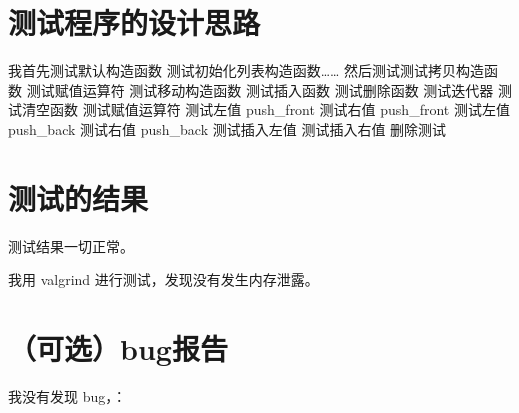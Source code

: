﻿\documentclass[UTF8]{ctexart}
\begin{document}
\pagestyle{fancy}
\fancyhead{}

\section{测试程序的设计思路}

我首先测试默认构造函数
测试初始化列表构造函数……
然后测试测试拷贝构造函数
测试赋值运算符
测试移动构造函数
测试插入函数
测试删除函数
测试迭代器
测试清空函数
测试赋值运算符
测试左值 push_front
测试右值 push_front
测试左值 push_back
测试右值 push_back
测试插入左值
测试插入右值
删除测试
\section{测试的结果}

测试结果一切正常。

我用 valgrind 进行测试，发现没有发生内存泄露。

\section{（可选）bug报告}

我没有发现 bug，：
\end{document}
